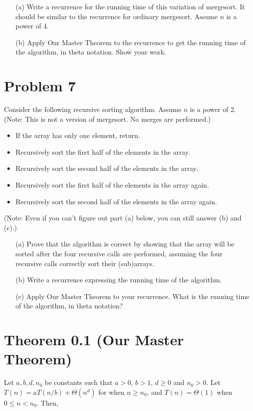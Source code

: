 \documentclass{article}
\begin{document}
\begin{enumerate}
    \item[(a)] Write a recurrence for the running time of this variation of mergesort. It should be similar to the recurrence for ordinary mergesort. Assume $n$ is a power of 4.
    \item[(b)] Apply Our Master Theorem to the recurrence to get the running time of the algorithm, in theta notation. Show your work.
\end{enumerate}

\section*{Problem 7}
Consider the following recursive sorting algorithm. Assume $n$ is a power of 2. (Note: This is not a version of mergesort. No merges are performed.)

\begin{itemize}
    \item If the array has only one element, return.
    \item Recursively sort the first half of the elements in the array.
    \item Recursively sort the second half of the elements in the array.
    \item Recursively sort the first half of the elements in the array again.
    \item Recursively sort the second half of the elements in the array again.

\end{itemize}
(Note: Even if you can’t figure out part (a) below, you can still answer (b) and (c).)

\begin{enumerate}
    \item[(a)] Prove that the algorithm is correct by showing that the array will be sorted after the four recursive calls are performed, assuming the four recursive calls correctly sort their (sub)arrays.
    \item[(b)] Write a recurrence expressing the running time of the algorithm.
    \item[(c)] Apply Our Master Theorem to your recurrence. What is the running time of the algorithm, in theta notation?
\end{enumerate}

\section*{Theorem 0.1 (Our Master Theorem)}
Let $a, b, d, n_0$ be constants such that $a > 0$, $b > 1$, $d \ge 0$ and $n_0 > 0$.
Let $T(n) = aT(n/b) + \Theta(n^d)$ for when $n \ge n_0$, and $T(n) = \Theta(1)$ when $0 \le n < n_0$. Then,
\end{document}
